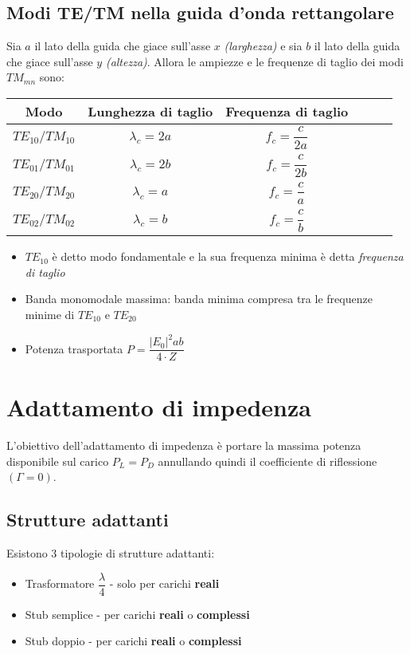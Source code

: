 \documentclass{article}
\begin{document}
\subsection{Modi TE/TM nella guida d'onda rettangolare}
Sia \(a\) il lato della guida che giace sull'asse \(x\) \textit{(larghezza)} e sia \(b\) il lato della guida che giace sull'asse \(y\) \textit{(altezza)}. Allora le ampiezze e le frequenze di taglio dei modi \(TM_{mn} \) sono:
\vspace{15pt}
\begin{center}
	\begin{tabular}{|Sc|Sc|Sc|}
		\hline
		Modo                  & Lunghezza di taglio & Frequenza di taglio     \\
		\hline
		\(TE_{10} / TM_{10}\) & \(\lambda_c = 2a\)  & \(f_c = \dfrac{c}{2a}\) \\
		\hline
		\(TE_{01} / TM_{01}\) & \(\lambda_c = 2b\)  & \(f_c = \dfrac{c}{2b}\) \\
		\hline
		\(TE_{20} / TM_{20}\) & \(\lambda_c = a\)   & \(f_c = \dfrac{c}{a}\)  \\
		\hline
		\(TE_{02} / TM_{02}\) & \(\lambda_c = b\)   & \(f_c = \dfrac{c}{b}\)  \\
		\hline
	\end{tabular}
\end{center}
\vspace{5pt}
\begin{itemize}
	\item \(TE_{10}\) è detto modo fondamentale e la sua frequenza minima è detta \textit{frequenza di taglio}
	\item Banda monomodale massima: banda minima compresa tra le frequenze minime di \(TE_{10}\) e \(TE_{20}\)
	\item Potenza trasportata \( P = \dfrac{|E_0|^2 a b}{4 \cdot Z} \)
\end{itemize}

\newpage

\section{Adattamento di impedenza}
L'obiettivo dell'adattamento di impedenza è portare la massima potenza disponibile sul carico \(P_L = P_D\) annullando quindi il coefficiente di riflessione \( (\Gamma = 0) \).

\subsection{Strutture adattanti}
Esistono 3 tipologie di strutture adattanti:\
\begin{itemize}
	\item Trasformatore \( \dfrac{\lambda}{4} \) - solo per carichi \textbf{reali}
	\item Stub semplice - per carichi \textbf{reali} o \textbf{complessi}
	\item Stub doppio - per carichi \textbf{reali} o \textbf{complessi}
\end{itemize}
\end{document}

